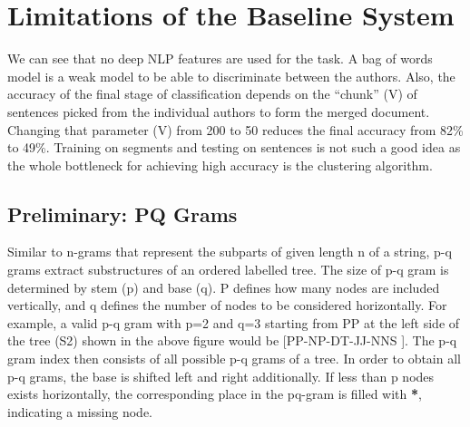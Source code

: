 \documentclass[letterpaper]{article}
\begin{document}
\begin{figure}

\end{figure}

\section{Limitations of the Baseline System}
We can see that no deep NLP features are used for the task. A bag of words model is a weak model to be able to discriminate between the authors. Also, the accuracy of the final stage of classification depends on the “chunk” (V) of sentences picked from the individual authors to form the merged document. Changing that parameter (V) from 200 to 50 reduces the final accuracy from 82\% to 49\%. Training on segments and testing on sentences is not such a good idea as the whole bottleneck for achieving high accuracy is the clustering algorithm.
\subsection{Preliminary: PQ Grams}
Similar to n-grams that represent the subparts of given length n of a string, p-q grams extract substructures of an ordered labelled tree. The size of p-q gram is determined by stem (p) and base (q). P defines how many nodes are included vertically, and q defines the number of nodes to be considered horizontally. For example, a valid p-q gram with p=2 and q=3 starting from PP at the left side of the tree (S2) shown in the above figure would be [PP-NP-DT-JJ-NNS ]. The p-q gram index then consists of all possible p-q grams of a tree. In order to obtain all p-q grams, the base is shifted left and right additionally. If less than p nodes exists horizontally, the corresponding place in the pq-gram is filled with \textbf{*}, indicating a missing node.\\
\end{document}
